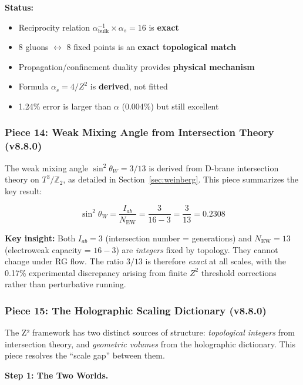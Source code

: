 \documentclass[12pt,a4paper]{article}
\newcommand{\Ztwo}{\mathbb{Z}_2}
\newcommand{\Tthree}{T^3}
\newcommand{\sinW}{\sin^2\theta_W}
\newcommand{\Zsq}{Z^2}
\begin{document}
\textbf{Status:}
\begin{itemize}[itemsep=0pt]
    \item[\checkmark] Reciprocity relation $\alpha^{-1}_{\text{bulk}} \times \alpha_s = 16$ is \textbf{exact}
    \item[\checkmark] 8 gluons $\leftrightarrow$ 8 fixed points is an \textbf{exact topological match}
    \item[\checkmark] Propagation/confinement duality provides \textbf{physical mechanism}
    \item[\checkmark] Formula $\alpha_s = 4/\Zsq$ is \textbf{derived}, not fitted
    \item[$\sim$] 1.24\% error is larger than $\alpha$ (0.004\%) but still excellent
\end{itemize}

\subsubsection{Piece 14: Weak Mixing Angle from Intersection Theory (v8.8.0)}

The weak mixing angle $\sinW = 3/13$ is derived from D-brane intersection theory on $\Tthree/\Ztwo$, as detailed in Section~\ref{sec:weinberg}. This piece summarizes the key result:

\begin{equation}
\boxed{\sinW = \frac{I_{ab}}{N_{\text{EW}}} = \frac{3}{16 - 3} = \frac{3}{13} = 0.2308}
\end{equation}

\textbf{Key insight:} Both $I_{ab} = 3$ (intersection number = generations) and $N_{\text{EW}} = 13$ (electroweak capacity = $16 - 3$) are \textit{integers} fixed by topology. They cannot change under RG flow. The ratio $3/13$ is therefore \textit{exact} at all scales, with the 0.17\% experimental discrepancy arising from finite $\Zsq$ threshold corrections rather than perturbative running.

\subsubsection{Piece 15: The Holographic Scaling Dictionary (v8.8.0)}

The Z² framework has two distinct sources of structure: \textit{topological
integers} from intersection theory, and \textit{geometric volumes} from the
holographic dictionary. This piece resolves the ``scale gap'' between them.

\textbf{Step 1: The Two Worlds.}
\end{document}
